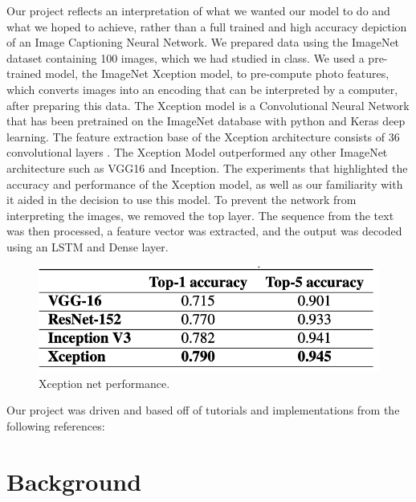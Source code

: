 \documentclass[conference]{IEEEtran}
\begin{document}
Our project reflects an interpretation of what we wanted our model to do and what we hoped to achieve, rather than a full trained and high accuracy depiction of an Image Captioning Neural Network. We prepared data using the ImageNet dataset containing 100 images, which we had studied in class. We used a pre-trained model, the ImageNet Xception model, to pre-compute photo features, which converts images into an encoding that can be interpreted by a computer, after preparing this data. The Xception model is a Convolutional Neural Network that has been pretrained on the ImageNet database with python and Keras deep learning. The feature extraction base of the Xception architecture consists of 36 convolutional layers \cite{b1}. The Xception Model outperformed any other ImageNet architecture such as VGG16 and Inception. The experiments that highlighted the accuracy and performance of the Xception model, as well as our familiarity with it aided in the decision to use this model. To prevent the network from interpreting the images, we removed the top layer. The sequence from the text was then processed, a feature vector was extracted, and the output was decoded using an LSTM and Dense layer.

\begin{figure}[htbp]
\centerline{\includegraphics[width=\linewidth]{comaprenets.png}}
\caption{Xception net performance.}
\label{fig1}
\end{figure}

Our project was driven and based off of tutorials and implementations from the following references: \cite{b2} \cite{b3} \cite{b4}

\section{Background}
\end{document}
